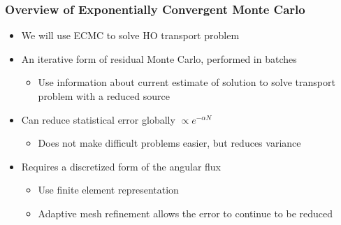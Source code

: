 \documentclass[xcolor=dvipsnames]{beamer}
\newcommand{\backupend}{
   \addtocounter{framenumberappendix}{-\value{framenumber}}
   \addtocounter{framenumber}{\value{framenumberappendix}} 
}
\newcommand{\colb}[1]{{\color{blue} #1}}
\newcommand{\colr}[1]{{\color{red} #1}}
\newlength{\wideitemsep}
\let\olditem\item
\renewcommand{\item}{\setlength{\itemsep}{\wideitemsep}\olditem}
\begin{document}
\begin{frame}
    \frametitle{Overview of Exponentially Convergent Monte Carlo}
    \begin{itemize}
        \item We will use ECMC to solve HO transport problem \pause
        \item An iterative form of residual Monte Carlo, performed in batches
      \begin{itemize}
        \item Use information about current estimate of solution to solve transport
            problem with a reduced source
      \end{itemize}
    \item Can reduce statistical error \colb{globally} $\propto e^{-\alpha N}$
            \begin{itemize}
                \item Does not make difficult problems easier, but reduces variance
            \end{itemize}\pause
        \item Requires a \colr{discretized} form of the angular flux            \begin{itemize}
                \item Use finite element representation
        \item Adaptive mesh refinement allows the error to continue to be reduced
    \end{itemize}
    \end{itemize}
\end{frame}

\backupend
\end{document}
